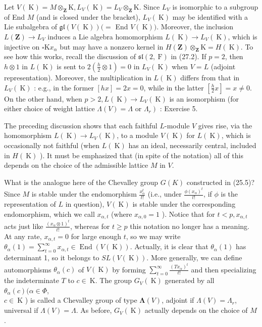 \documentclass[10pt]{article}
\begin{document}
Let $V(\mathrm{~K})=M \otimes_{\mathbf{Z}} \mathrm{K}, L_{V}(\mathrm{~K})=L_{V} \otimes_{\mathbf{Z}} \mathrm{K}$. Since $L_{V}$ is isomorphic to a subgroup of End $M$ (and is closed under the bracket), $L_{V}(\mathrm{~K})$ may be identified with a Lie subalgebra of $\mathfrak{g l}(V(\mathrm{~K}))(=$ End $V(\mathrm{~K}))$. Moreover, the inclusion $L(\mathbf{Z}) \rightarrow L_{V}$ induces a Lie algebra homomorphism $L(\mathrm{~K}) \rightarrow L_{V}(\mathrm{~K})$, which is injective on $\square \mathrm{K} x_{\alpha}$ but may have a nonzero kernel in $H(\mathbf{Z}) \otimes_{\mathbf{Z}} \mathrm{K}=H(\mathrm{~K})$. To see how this works, recall the discussion of $\mathfrak{s l}(2, \mathrm{~F})$ in (27.2). If $p=2$, then $h \otimes 1$ in $L(\mathrm{~K})$ is sent to $2\left(\frac{h}{2} \otimes 1\right)=0$ in $L_{V}(\mathrm{~K})$ when $V=L$ (adjoint representation). Moreover, the multiplication in $L(\mathrm{~K})$ differs from that in $L_{V}(\mathrm{~K})$ : e.g., in the former $[h x]=2 x=0$, while in the latter $\left[\frac{h}{2} x\right]=x \neq 0$. On the other hand, when $p>2, L(\mathrm{~K}) \rightarrow L_{V}(\mathrm{~K})$ is an isomorphism (for either choice of weight lattice $\Lambda(V)=\Lambda$ or $\left.\Lambda_{r}\right)$ : Exercise 5.

The preceding discussion shows that each faithful $L$-module $V$ gives rise, via the homomorphism $L(\mathrm{~K}) \rightarrow L_{V}(\mathrm{~K})$, to a module $V(\mathrm{~K})$ for $L(\mathrm{~K})$, which is occasionally not faithful (when $L(\mathrm{~K})$ has an ideal, necessarily central, included in $H(\mathrm{~K})$ ). It must be emphasized that (in spite of the notation) all of this depends on the choice of the admissible lattice $M$ in $V$.

What is the analogue here of the Chevalley group $G(K)$ constructed in (25.5)? Since $M$ is stable under the endomorphism $\frac{x_{\alpha}^{t}}{t!}$ (i.e., under $\frac{\phi\left(x_{\alpha}\right)^{t}}{t!}$, if $\phi$ is the representation of $L$ in question), $V(\mathrm{~K})$ is stable under the corresponding endomorphism, which we call $x_{\alpha, t}$ (where $x_{\alpha, 0}=1$ ). Notice that for $t<p, x_{\alpha, t}$ acts just like $\frac{\left(x_{\alpha} \otimes 1\right)^{t}}{t!}$, whereas for $t \geq p$ this notation no longer has a meaning. At any rate, $x_{\alpha, t}=0$ for large enough $t$, so we may write $\theta_{\alpha}(1)=\sum_{t=0}^{\infty} x_{\alpha, t} \in \operatorname{End}(V(\mathrm{~K}))$. Actually, it is clear that $\theta_{\alpha}(1)$ has determinant 1, so it belongs to $S L(V(\mathrm{~K}))$. More generally, we can define automorphisms $\theta_{\alpha}(c)$ of $V(\mathrm{~K})$ by forming $\sum_{t=0}^{\infty} \frac{\left(T x_{\alpha}\right)^{t}}{t!}$ and then specializing the indeterminate $T$ to $c \in \mathrm{~K}$. The group $G_{V}(\mathrm{~K})$ generated by all $\theta_{\alpha}(c)(\alpha \in \Phi$,\\
$c \in \mathrm{~K}$ ) is called a Chevalley group of type $\boldsymbol{\Lambda}(V)$, adjoint if $\Lambda(V)=\Lambda_{r}$, universal if $\Lambda(V)=\Lambda$. As before, $G_{V}(\mathrm{~K})$ actually depends on the choice of $M$.
\end{document}
